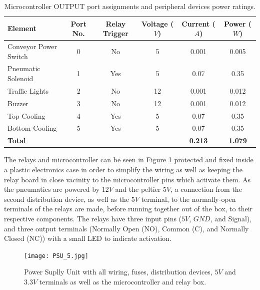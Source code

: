 \documentclass[fleqn,twoside]{article}
\begin{document}
\renewcommand{\arraystretch}{0.8}%
\begin{table}[h]
	\centering
	\caption{Microcontroller OUTPUT port assignments and peripheral devices power ratings.}
	\label{tab:micro_pinout_out}
	\begin{tabularx}{\linewidth}{Xccccc}
		\toprule
		\textbf{Element}  & \textbf{Port No.}  & \textbf{Relay Trigger} & \textbf{Voltage ($V$)} & \textbf{Current ($A$)} & \textbf{Power ($W$)}\\[8pt]
		\midrule
		Conveyor Power Switch 	& 0 & No & 5 & 0.001 & 0.005 \\[4pt]
		\midrule
		Pneumatic Solenoid 		& 1 & Yes & 5 & 0.07 & 0.35 \\[4pt]
		\midrule
		Traffic Lights 			& 2 & No & 12 & 0.001 & 0.012 \\[4pt]
		\midrule
		Buzzer 					& 3 & No & 12 & 0.001 & 0.012 \\[4pt]
		\midrule
		Top Cooling 			& 4 & Yes & 5 & 0.07 & 0.35 \\[4pt]
		\midrule
		Bottom Cooling 			& 5 & Yes & 5 & 0.07 & 0.35 \\[4pt]
		\midrule
		\textbf{Total} 			&    &     &   & \textbf{0.213} & \textbf{1.079} \\[4pt]
		\bottomrule
		
	\end{tabularx}
\end{table}


The relays and microcontroller can be seen in Figure \ref{fig:PSU_5} protected and fixed inside a plastic electronics case in order to simplify the wiring as well as keeping the relay board in close vacinity to the microcontroller pins which activate them. As the pneumatics are powered by $12V$ and the peltier $5V$, a connection from the second distribution device, as well as the $5V$ terminal, to the normally-open terminals of the relays are made, before running together out of the box, to their respective components. The relays have three input pins ($5V$, $GND$, and Signal), and three output terminals (Normally Open (NO), Common (C), and Normally Closed (NC)) with a small LED to indicate activation. 


\begin{figure}
	\begin{center}
		\texttt{[image: PSU\_5.jpg]}
	\end{center}
	\caption{Power Suplly Unit with all wiring, fuses, distribution devices, $5V$ and $3.3V$ terminals as well as the microcontroller and relay box.}
	\label{fig:PSU_5}
\end{figure}
\end{document}
